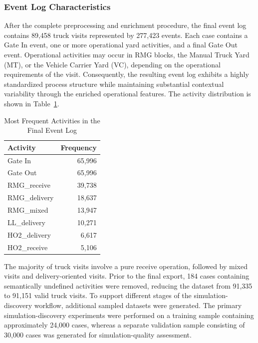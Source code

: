         \subsubsection{Event Log Characteristics} 
        After the complete preprocessing and enrichment procedure, the final event log contains 89,458 truck visits represented by 277,423 events.         
        Each case contains a Gate In event, one or more operational yard activities, and a final Gate Out event. Operational activities may occur in RMG blocks, the Manual Truck Yard (MT), or the Vehicle Carrier Yard (VC), depending on the operational requirements of the visit.
        Consequently, the resulting event log exhibits a highly standardized process structure while maintaining substantial contextual variability through the enriched operational features. The activity distribution is shown in Table~\ref{tab:activity_distribution}.
        
        \begin{table}[h] 
        \centering 
        \caption{Most Frequent Activities in the Final Event Log} 
        \label{tab:activity_distribution} 
        \begin{tabular}{lr} 
        \hline Activity & Frequency \\ \hline Gate In & 65,996 \\ Gate Out & 65,996 \\ RMG\_receive & 39,738 \\ RMG\_delivery & 18,637 \\ RMG\_mixed & 13,947 \\ LL\_delivery & 10,271 \\ HO2\_delivery & 6,617 \\ HO2\_receive & 5,106 \\ \hline 
        \end{tabular} 
        \end{table} 

        
        The majority of truck visits involve a pure receive operation, followed by mixed visits and delivery-oriented visits. Prior to the final export, 184 cases containing semantically undefined activities were removed, reducing the dataset from 91,335 to 91,151 valid truck visits. To support different stages of the simulation-discovery workflow, additional sampled datasets were generated. The primary simulation-discovery experiments were performed on a training sample containing approximately 24,000 cases, whereas a separate validation sample consisting of 30,000 cases was generated for simulation-quality assessment.

